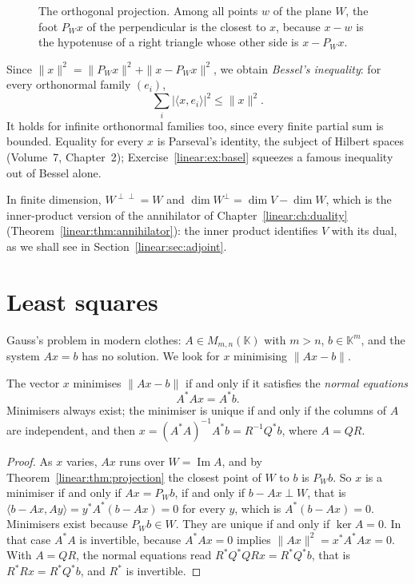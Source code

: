 \begin{figure}[ht]
\centering
{}
\caption{The orthogonal projection. Among all points $w$ of the plane $W$, the foot $P_Wx$ of the perpendicular is the
closest to $x$, because $x-w$ is the hypotenuse of a right triangle whose other side is $x-P_Wx$.}
\label{linear:fig:projection}
\end{figure}

Since $\|x\|^2=\|P_Wx\|^2+\|x-P_Wx\|^2$, we obtain \emph{Bessel's inequality}: for every orthonormal family $(e_i)$,
\begin{equation}\label{linear:eq:bessel}
\sum_i|\langle x,e_i\rangle|^2\le\|x\|^2.
\end{equation}
It holds for infinite orthonormal families too, since every finite partial sum is bounded. Equality for every $x$ is
Parseval's identity, the subject of Hilbert spaces (Volume~7, Chapter~2); Exercise~\ref{linear:ex:basel} squeezes a famous
inequality out of Bessel alone.

In finite dimension, $W^{\perp\perp}=W$ and $\dim W^\perp=\dim V-\dim W$, which is the inner-product version of the
annihilator of Chapter~\ref{linear:ch:duality} (Theorem~\ref{linear:thm:annihilator}): the inner product identifies $V$ with its dual,
as we shall see in Section~\ref{linear:sec:adjoint}.

\section{Least squares}

Gauss's problem in modern clothes: $A\in M_{m,n}(\mathbb K)$ with $m>n$, $b\in\mathbb K^m$, and the system $Ax=b$ has no
solution. We look for $x$ minimising $\|Ax-b\|$.

\begin{theorem}\label{linear:thm:lsq}
The vector $x$ minimises $\|Ax-b\|$ if and only if it satisfies the \emph{normal equations}
\[
A^*Ax=A^*b.
\]
Minimisers always exist; the minimiser is unique if and only if the columns of $A$ are independent, and then
$x=(A^*A)^{-1}A^*b=R^{-1}Q^*b$, where $A=QR$.
\end{theorem}
\begin{proof}
As $x$ varies, $Ax$ runs over $W=\operatorname{Im}A$, and by Theorem~\ref{linear:thm:projection} the closest point of $W$ to
$b$ is $P_Wb$. So $x$ is a minimiser if and only if $Ax=P_Wb$, if and only if $b-Ax\perp W$, that is
$\langle b-Ax,Ay\rangle=y^*A^*(b-Ax)=0$ for every $y$, which is $A^*(b-Ax)=0$. Minimisers exist because $P_Wb\in W$.
They are unique if and only if $\ker A=0$. In that case $A^*A$ is invertible, because $A^*Ax=0$ implies
$\|Ax\|^2=x^*A^*Ax=0$. With $A=QR$, the normal equations read $R^*Q^*QRx=R^*Q^*b$, that is $R^*Rx=R^*Q^*b$, and $R^*$ is
invertible.
\end{proof}

